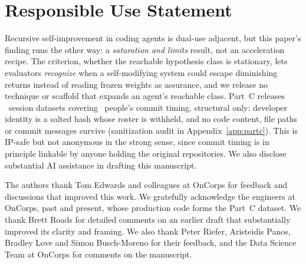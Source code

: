 \documentclass{article}
\theoremstyle{remark}
\theoremstyle{plain}
\begin{document}
\section*{Responsible Use Statement}
\label{sec:responsible-use}

Recursive self-improvement in coding agents is dual-use adjacent, but this paper's finding runs the other way: a \emph{saturation and limits} result, not an acceleration recipe. The criterion, whether the reachable hypothesis class is stationary, lets evaluators \emph{recognize} when a self-modifying system could escape diminishing returns instead of reading frozen weights as assurance, and we release no technique or scaffold that expands an agent's reachable class. Part~C releases \statPCReleasedDatasets\ session datasets covering \statPCReleasedDevelopers\ people's commit timing, structural only: developer identity is a salted hash whose roster is withheld, and no code content, file paths or commit messages survive (sanitization audit in Appendix~\ref{app:partc}). This is IP-safe but not anonymous in the strong sense, since commit timing is in principle linkable by anyone holding the original repositories. We also disclose substantial AI assistance in drafting this manuscript.

\clearpage
{}

\begin{ack}
The authors thank Tom Edwards and colleagues at OnCorps for feedback and
discussions that improved this work. We gratefully acknowledge the engineers at OnCorps,
past and present, whose production code forms the Part~C dataset.
We thank Brett Roads for detailed comments on an earlier draft that
substantially improved its clarity and framing. We also thank Peter Riefer,
Aristeidis Panos, Bradley Love and Simon Busch-Moreno for their feedback, and
the Data Science Team at OnCorps for comments on the manuscript.
\end{ack}




\clearpage

\end{document}
